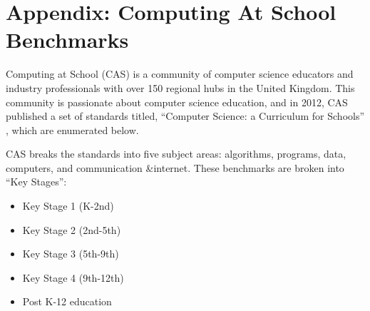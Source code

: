\chapter{Appendix: Computing At School Benchmarks} %

\label{AppendixCOMP} %


Computing at School (CAS) is a community of computer science educators and industry professionals with over 150 regional hubs in the United Kingdom. This community is passionate about computer science education, and in 2012, CAS published a set of standards titled, ``Computer Science: a Curriculum for Schools'' \cite{computas}, which are enumerated below.\par 
CAS breaks the standards into five subject areas: algorithms, programs, data, computers, and communication \&internet. These benchmarks are broken into ``Key Stages'':
\begin{itemize}
	\item Key Stage 1 (K-2nd)
	\item Key Stage 2 (2nd-5th)
	\item Key Stage 3 (5th-9th)
	\item Key Stage 4 (9th-12th)
	\item Post K-12 education
\end{itemize}

